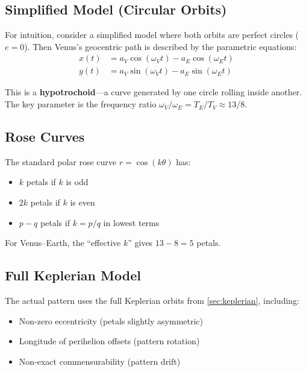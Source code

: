 \documentclass[11pt,letterpaper]{article}
\theoremstyle{definition}
\theoremstyle{plain}
\theoremstyle{remark}
\begin{document}
\subsection{Simplified Model (Circular Orbits)}

For intuition, consider a simplified model where both orbits are
perfect circles ($e = 0$). Then Venus's geocentric path is
described by the parametric equations:
\begin{equation}
  \begin{aligned}
    x(t) &= a_V \cos(\omega_V t) - a_E \cos(\omega_E t) \\
    y(t) &= a_V \sin(\omega_V t) - a_E \sin(\omega_E t)
  \end{aligned}
  \label{eq:circular_rose}
\end{equation}

This is a \textbf{hypotrochoid}—a curve generated by one circle
rolling inside another. The key parameter is the frequency ratio
$\omega_V / \omega_E = T_E / T_V \approx 13/8$.

\subsection{Rose Curves}

The standard polar rose curve $r = \cos(k\theta)$ has:
\begin{itemize}[nosep]
  \item $k$ petals if $k$ is odd
  \item $2k$ petals if $k$ is even
  \item $p - q$ petals if $k = p/q$ in lowest terms
\end{itemize}

For Venus--Earth, the ``effective $k$'' gives $13 - 8 = 5$ petals.

\subsection{Full Keplerian Model}

The actual pattern uses the full Keplerian orbits from
\cref{sec:keplerian}, including:
\begin{itemize}[nosep]
  \item Non-zero eccentricity (petals slightly asymmetric)
  \item Longitude of perihelion offsets (pattern rotation)
  \item Non-exact commensurability (pattern drift)
\end{itemize}
\end{document}
